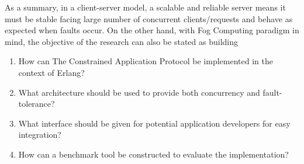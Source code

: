 As a summary, in a client-server model, a scalable and reliable server means it must be stable facing large number of concurrent clients/requests and behave as expected when faults occur. On the other hand, with Fog Computing paradigm in mind, the objective of the research can also be stated as building 

\begin{enumerate}

\item How can The Constrained Application Protocol be implemented in the context of Erlang? 
\item What architecture should be used to provide both concurrency and fault-tolerance? 
\item What interface should be given for potential application developers for easy integration? 
\item How can a benchmark tool be constructed to evaluate the implementation? 

\end{enumerate}

